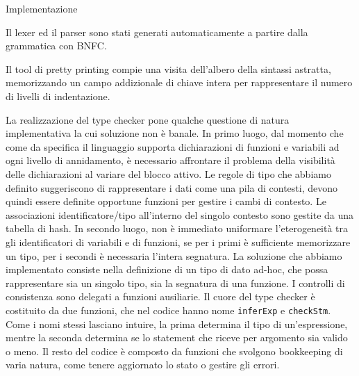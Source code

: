 \begin{section}{Implementazione}

	Il lexer ed il parser sono stati generati automaticamente a partire
	dalla grammatica con BNFC.

	Il tool di pretty printing compie una visita dell'albero della
	sintassi astratta, memorizzando un campo addizionale di chiave
	intera per rappresentare il numero di livelli di indentazione.

	La realizzazione del type checker pone qualche questione di
	natura implementativa la cui soluzione non \`e banale. In primo luogo,
	dal momento che come da specifica il linguaggio supporta dichiarazioni
	di funzioni e variabili ad ogni livello di annidamento, \`e necessario
	affrontare il problema della visibilit\`a delle dichiarazioni
	al variare del blocco attivo. Le regole di tipo che abbiamo definito
	suggeriscono di rappresentare i dati come una pila di contesti,
	devono quindi essere definite opportune funzioni per gestire i
	cambi di contesto. 
	Le associazioni identificatore/tipo all'interno
	del singolo contesto sono gestite da una tabella di hash. In
	secondo luogo, non \`e immediato uniformare l'eterogeneit\`a tra gli
	identificatori di variabili e di funzioni, se per i primi \`e
	sufficiente memorizzare un tipo, per i secondi \`e necessaria l'intera
	segnatura. La soluzione che abbiamo implementato consiste nella
	definizione di un tipo di dato ad-hoc, che possa rappresentare sia
	un singolo tipo, sia la segnatura di una funzione. I controlli di
	consistenza sono delegati a funzioni ausiliarie.
	Il cuore del type checker \`e costituito da due funzioni, che nel
	codice hanno nome \texttt{inferExp} e \texttt{checkStm}. Come i
	nomi stessi lasciano intuire, la prima determina il tipo di
	un'espressione, mentre la seconda determina se lo statement che
	riceve per argomento sia valido o meno. Il resto del codice \`e
	composto da funzioni che svolgono bookkeeping di varia natura, come
	tenere aggiornato lo stato o gestire gli errori.

\end{section}
